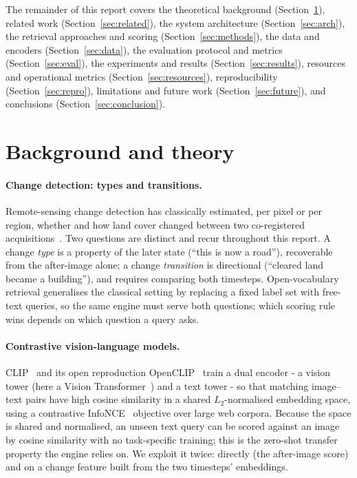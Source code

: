 \documentclass{article}
\begin{document}
The remainder of this report covers the theoretical background
(Section~\ref{sec:background}), related work (Section~\ref{sec:related}), the
system architecture (Section~\ref{sec:arch}), the retrieval approaches and
scoring (Section~\ref{sec:methods}), the data and encoders
(Section~\ref{sec:data}), the evaluation protocol and metrics
(Section~\ref{sec:eval}), the experiments and results
(Section~\ref{sec:results}), resources and operational metrics
(Section~\ref{sec:resources}), reproducibility (Section~\ref{sec:repro}),
limitations and future work (Section~\ref{sec:future}), and conclusions
(Section~\ref{sec:conclusion}).


\section{Background and theory}
\label{sec:background}

\paragraph{Change detection: types and transitions.}
Remote-sensing change detection has classically estimated, per pixel or per
region, whether and how land cover changed between two co-registered
acquisitions~\cite{changedetection}. Two questions are distinct and recur
throughout this report. A change \emph{type} is a property of the later state
(``this is now a road''), recoverable from the after-image alone; a change
\emph{transition} is directional (``cleared land became a building''), and
requires comparing both timesteps. Open-vocabulary retrieval generalises the
classical setting by replacing a fixed label set with free-text queries, so the
same engine must serve both questions; which scoring rule wins depends on which
question a query asks.

\paragraph{Contrastive vision-language models.}
CLIP~\cite{clip} and its open reproduction OpenCLIP~\cite{openclip} train a dual
encoder - a vision tower (here a Vision Transformer~\cite{vit}) and a text
tower - so that matching image--text pairs have high cosine similarity in a
shared $L_2$-normalised embedding space, using a contrastive
InfoNCE~\cite{infonce} objective over large web corpora. Because the space is
shared and normalised, an unseen text query can be scored against an image by
cosine similarity with no task-specific training; this is the zero-shot transfer
property the engine relies on. We exploit it twice: directly (the after-image
score) and on a change feature built from the two timesteps' embeddings.
\end{document}
